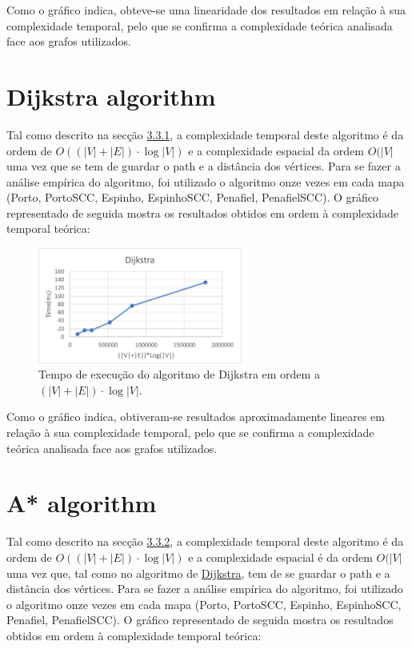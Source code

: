 \documentclass[12pt,a4paper]{report}
\begin{document}
Como o gráfico indica, obteve-se uma linearidade dos resultados em relação à sua complexidade temporal, pelo que se confirma a complexidade teórica
analisada face aos grafos utilizados.


\section{Dijkstra algorithm}
Tal como descrito na secção \hyperref[algo:dijkstra]{3.3.1}, a complexidade temporal deste algoritmo é da ordem de \( O((|V| + |E|)\cdot \log |V|) \) e a complexidade
espacial da ordem \(O(|V|\) uma vez que se tem de guardar o path e a distância dos vértices.
Para se fazer a análise empírica do algoritmo, foi utilizado o algoritmo onze vezes em cada mapa (Porto, PortoSCC, Espinho, EspinhoSCC, Penafiel, PenafielSCC).
O gráfico representado de seguida mostra os resultados obtidos em ordem à complexidade temporal teórica:

\begin{figure}[H]
	\includegraphics[width=0.6\textwidth]{./imgs/charts/DijkstraTime.png}
	\centering
	\caption{Tempo de execução do algoritmo de Dijkstra em ordem a $(|V|+|E|)\cdot \log |V|$.}
\end{figure}


Como o gráfico indica, obtiveram-se resultados aproximadamente lineares em relação à sua complexidade temporal, pelo que se confirma a complexidade teórica
analisada face aos grafos utilizados.


\section{A* algorithm}
Tal como descrito na secção \hyperref[algo:astar]{3.3.2}, a complexidade temporal deste algoritmo é da ordem de \( O((|V| + |E|)\cdot \log |V|) \) e a complexidade espacial
é da ordem \(O(|V|\) uma vez que, tal como no algoritmo de \hyperref[algo:dijkstra]{Dijkstra}, tem de se guardar o path e a distância dos vértices.
Para se fazer a análise empírica do algoritmo, foi utilizado o algoritmo onze vezes em cada mapa (Porto, PortoSCC, Espinho, EspinhoSCC, Penafiel, PenafielSCC).
O gráfico representado de seguida mostra os resultados obtidos em ordem à complexidade temporal teórica:
\end{document}
